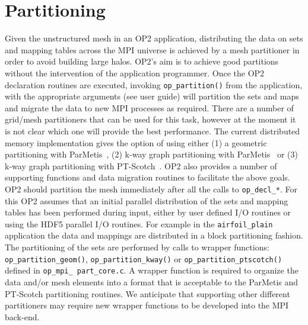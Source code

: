 \documentclass[11pt]{article}
\begin{document}
\newpage
\section{Partitioning}\label{sec/partitioning}
Given the unstructured mesh in an OP2 application, distributing the data on sets and mapping tables across the MPI
universe is achieved by a mesh partitioner in order to avoid building large halos. OP2's aim is to achieve good
partitions without the intervention of the application programmer. Once the OP2 declaration routines are executed,
invoking \texttt{op\_partition()} from the application, with the appropriate arguments (see user guide) will partition
the sets and maps and migrate the data to new MPI processes as required. There are a number of grid/mesh partitioners
that can be used for this task, however at the moment it is not clear which one will provide the best performance. The
current distributed memory implementation gives the option of using either (1) a geometric partitioning with
ParMetis~\cite{ParMETIS}, (2) k-way graph partitioning with ParMetis~\cite{ParMETIS} or (3) k-way graph partitioning
with PT-Scotch~\cite{PTScotch}. OP2 also provides a number of supporting functions and data migration routines to
facilitate the above goals.\\

\indent OP2 should partition the mesh immediately after all the calls to \texttt{op\_decl\_*}. For this OP2 assumes
that an initial parallel distribution of the sets and mapping tables has been performed during input, either by user
defined I/O routines or using the HDF5 parallel I/O routines. For example in the \texttt{airfoil\_plain} application the
data and mappings are distributed in a block partitioning fashion. The partitioning of the sets are performed by calls
to wrapper functions: \texttt{op\_partition\_geom()}, \texttt{op\_partition\_kway()} or
\texttt{op\_partition\_ptscotch()} defined in \texttt{op\_mpi\_ part\_core.c}. A wrapper function is required to
organize the data and/or mesh elements into a format that is acceptable to the ParMetis and PT-Scotch partitioning
routines. We anticipate that supporting other different partitioners may require new wrapper functions to be developed
into the MPI back-end.

\end{document}
